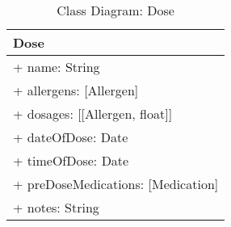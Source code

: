 \begin{table}[H]
\centering
\caption{Class Diagram: Dose}

\hspace{1em}
\renewcommand{\arraystretch}{1.7}

\begin{tabular}{|l|}
\hline
\textbf{Dose} \\
\hline
+ name: String \\
+ allergens: [Allergen] \\
+ dosages: [[Allergen, float]] \\
+ dateOfDose: Date \\
+ timeOfDose: Date \\
+ preDoseMedications: [Medication] \\
+ notes: String \\
\hline
\end{tabular}
\end{table}

